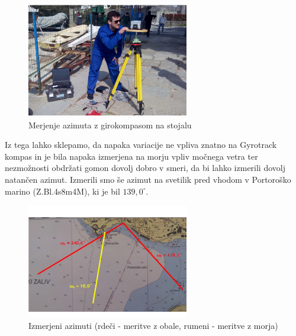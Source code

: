 \begin{figure}
	\centering
	\includegraphics[height=5cm]{Vaje/VzorecPoroc/figs/Aleks_Gyro.pdf}
	\caption{Merjenje azimuta z girokompasom na stojalu}
	\label{fig:Aleks_meri}       %
\end{figure}


Iz tega lahko sklepamo, da napaka variacije ne vpliva znatno na Gyrotrack kompas in je bila napaka izmerjena na morju vpliv močnega vetra ter nezmožnosti obdržati gomon dovolj dobro v smeri, da bi lahko izmerili dovolj natančen azimut. Izmerili smo še azimut na svetilik pred vhodom v Portoroško marino (Z.Bl.4s8m4M), ki je bil $139,0^{\circ}$.

\begin{figure}
	\centering
	\includegraphics[height=5cm]{Vaje/VzorecPoroc/figs/Karta_Azimuti.pdf}
	\caption{Izmerjeni azimuti (rdeči - meritve z obale, rumeni - meritve z morja)}
	\label{fig:Karta_IzmerAzimuti}       %
\end{figure}



